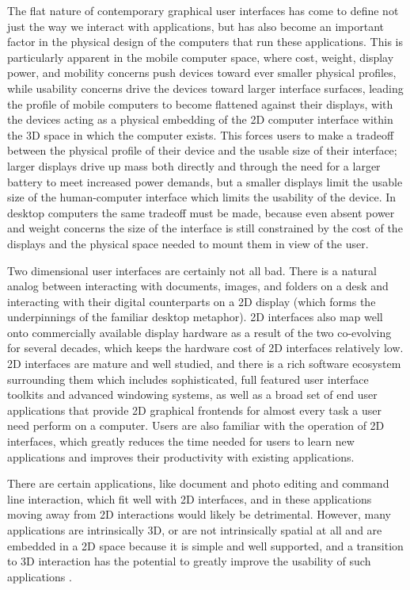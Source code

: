 The flat nature of contemporary graphical user interfaces has come to define not just the way we interact with applications, but has also become an important factor in the physical design of the computers that run these applications. This is particularly apparent in the mobile computer space, where cost, weight, display power, and mobility concerns push devices toward ever smaller physical profiles, while usability concerns drive the devices toward larger interface surfaces, leading the profile of mobile computers to become flattened against their displays, with the devices acting as a physical embedding of the 2D computer interface within the 3D space in which the computer exists. This forces users to make a tradeoff between the physical profile of their device and the usable size of their interface; larger displays drive up mass both directly and through the need for a larger battery to meet increased power demands, but a smaller displays limit the usable size of the human-computer interface which limits the usability of the device. In desktop computers the same tradeoff must be made, because even absent power and weight concerns the size of the interface is still constrained by the cost of the displays and the physical space needed to mount them in view of the user.

Two dimensional user interfaces are certainly not all bad. There is a natural analog between interacting with documents, images, and folders on a desk and interacting with their digital counterparts on a 2D display (which forms the underpinnings of the familiar desktop metaphor). 2D interfaces also map well onto commercially available display hardware as a result of the two co-evolving for several decades, which keeps the hardware cost of 2D interfaces relatively low. 2D interfaces are mature and well studied, and there is a rich software ecosystem surrounding them which includes sophisticated, full featured user interface toolkits and advanced windowing systems, as well as a broad set of end user applications that provide 2D graphical frontends for almost every task a user need perform on a computer. Users are also familiar with the operation of 2D interfaces, which greatly reduces the time needed for users to learn new applications and improves their productivity with existing applications. 

There are certain applications, like document and photo editing and command line interaction, which fit well with 2D interfaces, and in these applications moving away from 2D interactions would likely be detrimental. However, many applications are intrinsically 3D, or are not intrinsically spatial at all and are embedded in a 2D space because it is simple and well supported, and a transition to 3D interaction has the potential to greatly improve  the usability of such applications \cite{bowman_theory_practice}.

